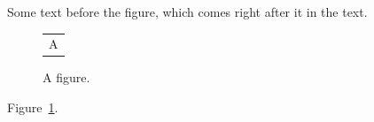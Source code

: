 \documentclass{article}
\begin{document}
Some text before the figure, which comes right after it in the text.
\begin{figure}[H]
\centering
\begin{tabular}{c}A\end{tabular}
\caption{A figure.}\label{f1}
\end{figure}
Figure~\ref{f1}.
\end{document}
